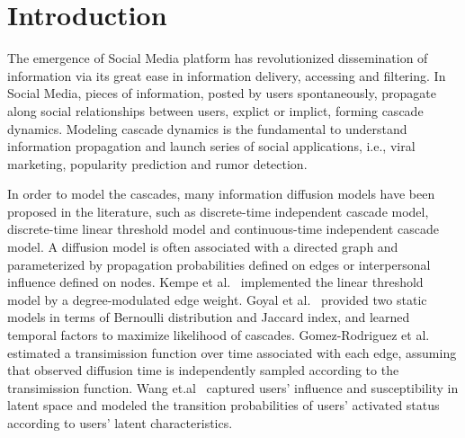 \section{Introduction}

The emergence of Social Media platform has revolutionized dissemination of
information via its great ease in information delivery, accessing and filtering. 
In Social Media, pieces of information, posted by users spontaneously, propagate
along social relationships between users, explict or implict, forming cascade dynamics.
Modeling cascade dynamics is the fundamental to understand information
propagation and launch series of social applications, i.e., viral marketing,
popularity prediction and rumor detection. 

In order to model the cascades, many information diffusion models have been
proposed in the literature, such as discrete-time independent cascade model,
discrete-time linear threshold model and continuous-time independent cascade
model. A diffusion model is often associated with a directed graph and 
parameterized by propagation probabilities defined on edges or interpersonal
influence defined on nodes.
Kempe et al.~\cite{kempe2003maximizing} implemented
the linear threshold model by a degree-modulated edge weight. Goyal et
al.~\cite{goyal2010learning} provided two static models in terms of Bernoulli
distribution and Jaccard index, and learned temporal factors to maximize
likelihood of cascades. Gomez-Rodriguez et al.~\cite{gomez2013modeling}
estimated a transimission function over time associated with each edge, assuming
that observed diffusion time is independently sampled according to the
transimission function. Wang et.al~\cite{WangAAAI15}
captured users' influence and susceptibility in latent space and modeled the
transition probabilities of users' activated status according to users' latent
characteristics.

% 
% 
% 

